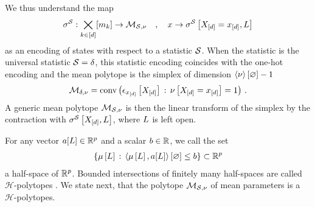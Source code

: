 We thus understand the map
\begin{align*}
    \sigma^{\mathcal{S}} : \bigtimes_{k\in[d]}[m_{k}]\rightarrow\mathcal{M}_{\mathcal{S},\nu} \quad,\quad x \rightarrow \sigma^{\mathcal{S}}\left[X_{[d]}=x_{[d]},L\right]
\end{align*}
as an encoding of states with respect to a statistic $\mathcal{S}$.
When the statistic is the universal statistic $\mathcal{S}=\delta$, this statistic encoding coincides with the one-hot encoding and the mean polytope is the simplex of dimension $\left\langle \nu\right\rangle \left[ \varnothing \right]-1$ %
\begin{align*}
    \mathcal{M}_{\delta,\nu}
    = \mathrm{conv}\left(\epsilon_{x_{[d]}}\left[X_{[d]}\right]\,:\,\nu\left[X_{[d]}=x_{[d]}\right]=1\right)\, .
\end{align*}
A generic mean polytope $\mathcal{M}_{\mathcal{S},\nu}$ is then the linear transform of the simplex by the contraction with $\sigma^{\mathcal{S}}\left[X_{[d]},L\right]$, where $L$ is left open.%



For any vector $a[L]\in\mathbb{R}^{p}$ and a scalar $b\in\mathbb{R}$, we call the set
\begin{align*}
    \left\{\mu\left[L\right] \,:\,\left\langle \mu\left[L\right],a[L]\right\rangle \left[ \varnothing \right] \leq b \right\} \subset \mathbb{R}^{p}
\end{align*}
a half-space of $\mathbb{R}^p$.
Bounded intersections of finitely many half-spaces are called $\mathcal{H}$-polytopes \cite{ziegler_lectures_2013}.
We state next, that the polytope $\mathcal{M}_{\mathcal{S},\nu}$ of mean parameters is a $\mathcal{H}$-polytopes.


